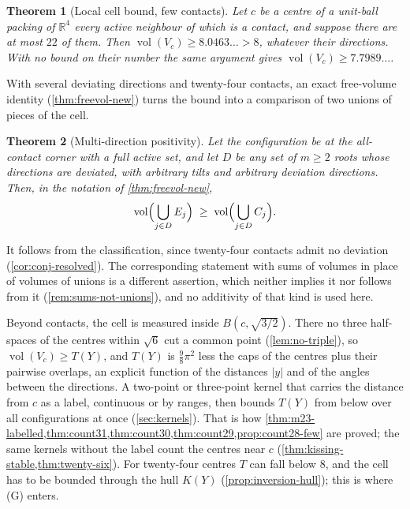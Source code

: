 \documentclass[11pt,reqno]{amsart}
\renewcommand{\_}{\origunderscore\allowbreak}
\numberwithin{equation}{section}
\theoremstyle{plain}
\newtheorem{thm}{Theorem}[section]
\theoremstyle{definition}
\theoremstyle{remark}
\DeclareMathOperator{\vol}{vol}
\begin{document}
\begin{thm}[Local cell bound, few contacts]\label{thm:local-fewcontacts}
Let $c$ be a centre of a unit-ball packing of $\mathbb{R}^4$ every active
neighbour of which is a contact, and suppose there are at most $22$ of
them. Then $\vol(V_c)\ge8.0463\ldots>8$, whatever their directions. With
no bound on their number the same argument gives $\vol(V_c)\ge7.7989\ldots$.
\end{thm}

With several deviating directions and twenty-four contacts, an exact
free-volume identity (\cref{thm:freevol-new}) turns the bound into a
comparison of two unions of pieces of the cell.

\begin{thm}[Multi-direction positivity]\label{conj:multidir-new}
Let the configuration be at the all-contact corner with a full active
set, and let $D$ be any set of $m\ge2$ roots whose directions are
deviated, with arbitrary tilts and arbitrary deviation directions. Then,
in the notation of \cref{thm:freevol-new},
\[
  \vol\Bigl(\bigcup_{j\in D}E_j\Bigr)
  \;\ge\;
  \vol\Bigl(\bigcup_{j\in D}C_j\Bigr).
\]
\end{thm}

It follows from the classification, since twenty-four contacts admit no
deviation (\cref{cor:conj-resolved}). The corresponding statement with sums
of volumes in place of volumes of unions is a different assertion, which
neither implies it nor follows from it (\cref{rem:sums-not-unions}), and no additivity of that kind is used here.

Beyond contacts, the cell is measured inside $B(c,\sqrt{3/2})$. There no
three half-spaces of the centres within $\sqrt6$ cut a common point
(\cref{lem:no-triple}), so $\vol(V_c)\ge T(Y)$, and $T(Y)$ is
$\frac98\pi^2$ less the caps of the centres plus their pairwise
overlaps, an explicit function of the distances $|y|$ and of the angles
between the directions. A two-point or three-point kernel that carries the
distance from $c$ as a label, continuous or by ranges, then bounds $T(Y)$
from below over all configurations at once (\cref{sec:kernels}). That is how
\cref{thm:m23-labelled,thm:count31,thm:count30,thm:count29,prop:count28-few} are proved; the same
kernels without the label count the centres near $c$
(\cref{thm:kissing-stable,thm:twenty-six}). For twenty-four centres $T$ can fall below $8$, and the cell has to
be bounded through the hull $K(Y)$ (\cref{prop:inversion-hull}); this is
where (G) enters.
\end{document}

